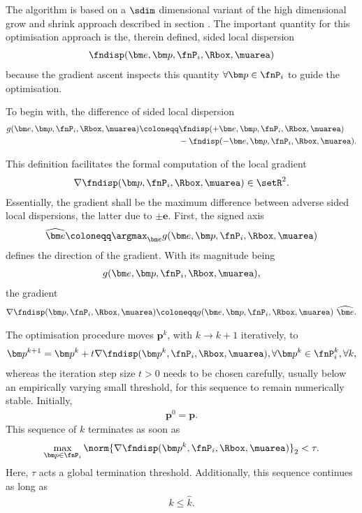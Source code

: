 %
The algorithm is based on a $\sdim$ dimensional variant of the high dimensional grow and shrink approach described in section . The important quantity for this optimisation approach is the, therein defined, sided local dispersion 
\begin{align*}
  \fndisp(\bm e, \bm p, \fnP_i, \Rbox, \muarea)
\end{align*}
because the gradient ascent inspects this quantity $\forall \bm p \in \fnP_i$ to guide the optimisation.

To begin with, the difference of sided local dispersion
\begin{align*}
  g(\bm e, \bm p, \fnP_i, \Rbox, \muarea) \coloneqq &\fndisp(+\bm e, \bm p, \fnP_i, \Rbox, \muarea) \\
  &- \fndisp(-\bm e, \bm p, \fnP_i, \Rbox, \muarea).
\end{align*}

This definition facilitates the formal computation of the local gradient
\begin{align*}
  \nabla\fndisp(\bm p, \fnP_i, \Rbox, \muarea) \in \setR^2.
\end{align*}
Essentially, the gradient shall be the maximum difference between adverse sided local dispersions, the latter due to $\pm \bm e$. First, the signed axis
\begin{align*}
  \widehat{\bm e} \coloneqq \argmax_{\bm e} g(\bm e, \bm p, \fnP_i, \Rbox, \muarea)
\end{align*}
defines the direction of the gradient. With its magnitude being
\begin{align*}
  g(\bm e, \bm p, \fnP_i, \Rbox, \muarea),
\end{align*}
the gradient 
\begin{align*}
  \nabla\fndisp(\bm p, \fnP_i, \Rbox, \muarea) \coloneqq g(\bm e, \bm p, \fnP_i, \Rbox, \muarea)\ \widehat{\bm e}.
\end{align*}

The optimisation procedure moves $\bm p^k$, with $k \rightarrow k+1$ iteratively, to
\begin{align*}
  \bm p^{k+1} = \bm p^k + t \nabla\fndisp(\bm p^k, \fnP_i, \Rbox, \muarea), \forall \bm p^k \in \fnP_i^k, \forall k,
\end{align*}
whereas the iteration step size $t > 0$ needs to be chosen carefully, usually below an empirically varying small threshold, for this sequence to remain numerically stable. Initially,
\begin{align*}
  \bm p^0 = \bm p.
\end{align*}
This sequence of $k$ terminates as soon as
\begin{align*}
  \max_{\bm p \in \fnP_i} \norm{\nabla\fndisp(\bm p^k, \fnP_i, \Rbox, \muarea)}_2 < \tau.
\end{align*}
Here, $\tau$ acts a global termination threshold. Additionally, this sequence continues as long as
\begin{align*}
  k \leq \widehat k.
\end{align*}

